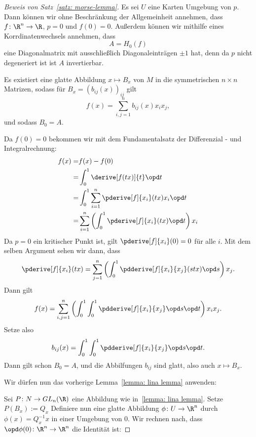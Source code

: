 \begin{proof}[Beweis von Satz~\ref{satz: morse-lemma}]
    Es sei $U$ eine Karten Umgebung von $p$. Dann können wir ohne Beschränkung der 
    Allgemeinheit annehmen, dass $f \colon \R^n \to \R$, $p = 0$ und $f(0) = 0$.
    Außerdem können wir mithilfe eines Korrdinatenwechsels annehmen, dass 
    \[ A = H_0(f) \]
    eine Diagonalmatrix mit ausschließlich Diagonaleinträgen $\pm 1$ hat, denn da $p$
    nicht degeneriert ist ist $A$ invertierbar. 
    \begin{claim*}
        Es existiert eine glatte Abbildung $x \mapsto B_x$ von $M$ in die symmetrischen
        $n \times n$ Matrizen, sodass für $B_x = (b_{ij}(x))_{ij}$ gilt 
        \[ f(x) = \sum_{i, j = 1}^n b_{ij}(x) x_i x_j , \]
        und sodass $B_0 = A$. 
    \end{claim*}
    \begin{smallproof}
        Da $f(0) = 0$ bekommen wir mit dem Fundamentalsatz der 
        Differenzial - und Integralrechnung: 
        \begin{align*}
            f(x) = & f(x) - f(0) \\
            = & \int_0^1 \derive[f (tx)]{t} \opd t \\
            = & \int_0^1 \sum_{i = 1}^n \pderive[f]{x_i}(tx) x_i \opd t \\
            = & \sum_{i = 1}^n \left( \int_0^1 \pderive[f]{x_i}(tx) \opd t \right) x_i
        \end{align*}
        Da $p = 0$ ein kritischer Punkt ist, gilt $\pderive[f]{x_i}(0) = 0$ für alle 
        $i$. Mit dem selben Argument sehen wir dann, dass
        \[ \pderive[f]{x_i}(tx) = 
        \sum_{j = 1}^n \left( \int_0^1 \pdderive[f]{x_i}{x_j}(stx) \opd s \right) x_j . \]
        Dann gilt 
        \[ f(x) = 
            \sum_{i, j = 1}^n 
            \left( \int_0^1 \int_0^1 \pdderive[f]{x_i}{x_j} \opd s \opd t \right) 
            x_i x_j 
        . \]
        Setze also 
        \[ b_{ij}(x) = \int_0^1 \int_0^1 \pdderive[f]{x_i}{x_j} \opd s \opd t . \]
        Dann gilt schon $B_0  = A$, und die Abbilfungen $b_{ij}$ sind glatt, also 
        auch $x \mapsto B_ x$.
    \end{smallproof}
    Wir dürfen nun das vorherige Lemma~\ref{lemma: lina lemma} anwenden:

    Sei $P \colon N \to GL_n(\R)$ eine Abbildung wie in~\ref{lemma: lina lemma}.
    Setze $P(B_x) := Q_x$ Definiere nun eine glatte Abbildung $\phi \colon U \to \R^n$
    durch $\phi (x) = Q_x^{-1}x$ in einer Umgebung von $0$. Wir rechnen nach, dass 
    $\opd \phi (0) \colon \R^n \to \R^n$ die Identität ist:


\end{proof}
